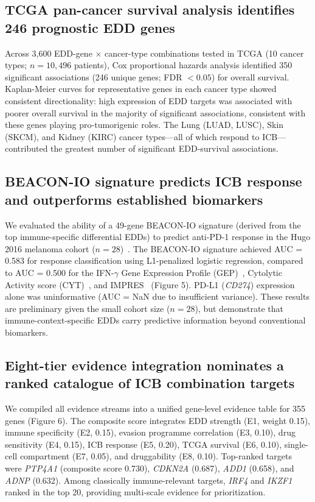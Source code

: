 \documentclass[12pt]{article}
\begin{document}
\subsection*{TCGA pan-cancer survival analysis identifies 246 prognostic EDD genes}

Across 3,600 EDD-gene $\times$ cancer-type combinations tested in TCGA (10 cancer types; $n = 10,496$ patients), Cox proportional hazards analysis identified 350 significant associations (246 unique genes; FDR $< 0.05$) for overall survival. Kaplan-Meier curves for representative genes in each cancer type showed consistent directionality: high expression of EDD targets was associated with poorer overall survival in the majority of significant associations, consistent with these genes playing pro-tumorigenic roles. The Lung (LUAD, LUSC), Skin (SKCM), and Kidney (KIRC) cancer types---all of which respond to ICB---contributed the greatest number of significant EDD-survival associations.

\subsection*{BEACON-IO signature predicts ICB response and outperforms established biomarkers}

We evaluated the ability of a 49-gene BEACON-IO signature (derived from the top immune-specific differential EDDs) to predict anti-PD-1 response in the Hugo 2016 melanoma cohort ($n = 28$)~\citep{Hugo2016}. The BEACON-IO signature achieved AUC = 0.583 for response classification using L1-penalized logistic regression, compared to AUC = 0.500 for the IFN-$\gamma$ Gene Expression Profile (GEP)~\citep{Ayers2017}, Cytolytic Activity score (CYT)~\citep{Rooney2015}, and IMPRES~\citep{Auslander2018} (Figure 5). PD-L1 (\textit{CD274}) expression alone was uninformative (AUC = NaN due to insufficient variance). These results are preliminary given the small cohort size ($n = 28$), but demonstrate that immune-context-specific EDDs carry predictive information beyond conventional biomarkers.

\subsection*{Eight-tier evidence integration nominates a ranked catalogue of ICB combination targets}

We compiled all evidence streams into a unified gene-level evidence table for 355 genes (Figure 6). The composite score integrates EDD strength (E1, weight 0.15), immune specificity (E2, 0.15), evasion programme correlation (E3, 0.10), drug sensitivity (E4, 0.15), ICB response (E5, 0.20), TCGA survival (E6, 0.10), single-cell compartment (E7, 0.05), and druggability (E8, 0.10). Top-ranked targets were \textit{PTP4A1} (composite score 0.730), \textit{CDKN2A} (0.687), \textit{ADD1} (0.658), and \textit{ADNP} (0.632). Among classically immune-relevant targets, \textit{IRF4} and \textit{IKZF1} ranked in the top 20, providing multi-scale evidence for prioritization.
\end{document}
